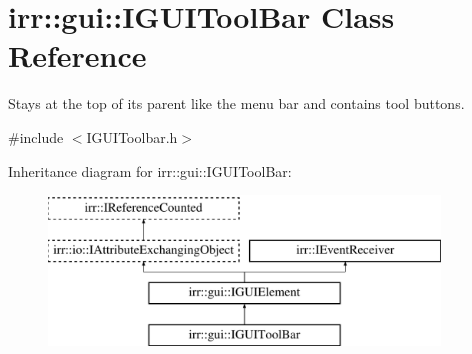 \hypertarget{classirr_1_1gui_1_1IGUIToolBar}{}\section{irr\+:\+:gui\+:\+:I\+G\+U\+I\+Tool\+Bar Class Reference}
\label{classirr_1_1gui_1_1IGUIToolBar}


Stays at the top of its parent like the menu bar and contains tool buttons.  




{\ttfamily \#include $<$I\+G\+U\+I\+Toolbar.\+h$>$}

Inheritance diagram for irr\+:\+:gui\+:\+:I\+G\+U\+I\+Tool\+Bar\+:\begin{figure}[H]
\begin{center}
\leavevmode
\includegraphics[height=4.000000cm]{classirr_1_1gui_1_1IGUIToolBar}
\end{center}
\end{figure}
